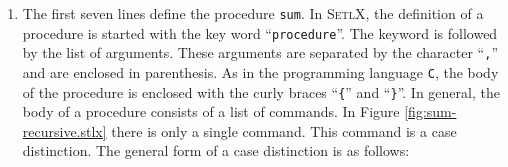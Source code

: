 \begin{enumerate}
\item The first seven lines define the procedure \texttt{sum}.  In \textsc{SetlX}, the definition of
      a procedure is started with the key word ``\texttt{procedure}''.  The keyword is followed by
      the list of arguments.  These arguments are separated by the character  ``\texttt{,}'' and
      are enclosed in parenthesis.
      As in the programming language \texttt{C}, the body of the procedure is enclosed with the curly braces
      ``\texttt{\{}'' and ``\texttt{\}}''.  In general, the body of a procedure consists of a list
      of commands.  In Figure \ref{fig:sum-recursive.stlx} there is only a single command.  This
      command is a case distinction.  The general form of a case distinction is as follows:


\end{enumerate}
